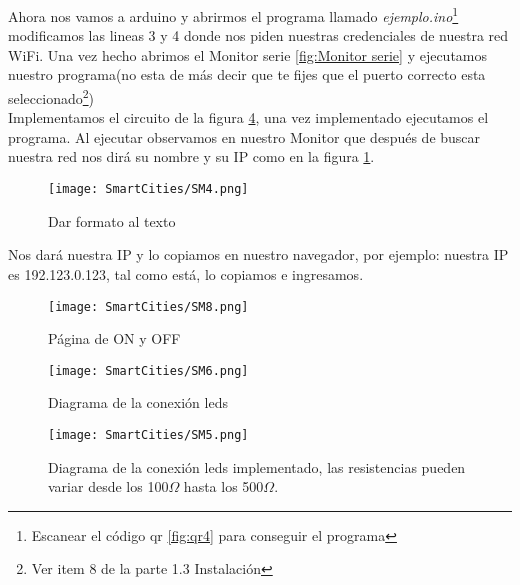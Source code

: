 \documentclass[
	12pt, %
	fleqn, %
	a4paper, %
]{LegrandOrangeBook}
\begin{document}
Ahora nos vamos a arduino y abrirmos el programa llamado \textit{ejemplo.ino}\footnote{Escanear el código qr \ref{fig:qr4} para conseguir el programa}
modificamos las lineas 3 y 4 donde nos piden nuestras credenciales de nuestra red WiFi. Una vez hecho abrimos el Monitor serie \ref{fig:Monitor serie} y ejecutamos nuestro programa(no esta de más decir que te fijes que el puerto correcto esta seleccionado\footnote{Ver item 8 de la parte 1.3 Instalación})\\
Implementamos el circuito de la figura \ref{fig:espleds2}, una vez implementado ejecutamos el programa.
Al ejecutar observamos en nuestro Monitor que después de buscar nuestra red nos dirá su nombre y su IP como en la figura \ref{fig:wifi+ip}.
\begin{figure}[h]
\centering\texttt{[image: SmartCities/SM4.png]}
\caption{Dar formato al texto}
\label{fig:wifi+ip}
\end{figure}
Nos dará nuestra IP y lo copiamos en nuestro navegador, por ejemplo: nuestra IP es 192.123.0.123, tal como está, lo copiamos e ingresamos.
\begin{figure}[h]
\centering
\texttt{[image: SmartCities/SM8.png]}
\caption{Página de ON y OFF}
\label{fig:paginaonoff}
\end{figure}
\begin{figure}[H]
\centering
\texttt{[image: SmartCities/SM6.png]}
\caption{Diagrama de la conexión leds}
\label{espleds1}
\end{figure}
\begin{figure}[H]
\centering
\texttt{[image: SmartCities/SM5.png]}
\caption{Diagrama de la conexión leds implementado, las resistencias pueden variar desde los 100$\Omega$ hasta los 500$\Omega$.}
\label{fig:espleds2}
\end{figure}
\newpage
\end{document}
